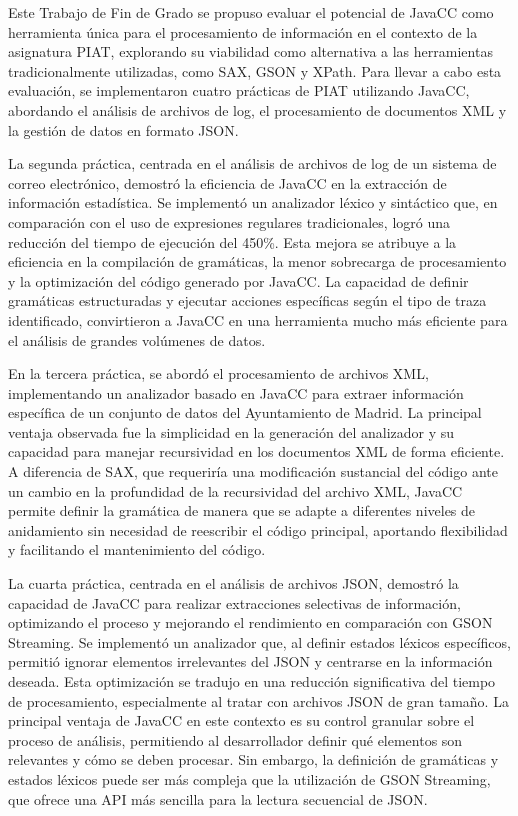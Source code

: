 \noindent Este Trabajo de Fin de Grado se propuso evaluar el potencial de JavaCC como herramienta única para el procesamiento de información en el contexto de la asignatura PIAT, explorando su viabilidad como alternativa a las herramientas tradicionalmente utilizadas, como SAX, GSON y XPath. Para llevar a cabo esta evaluación, se implementaron cuatro prácticas de PIAT utilizando JavaCC, abordando el análisis de archivos de log, el procesamiento de documentos XML y la gestión de datos en formato JSON.

La segunda práctica, centrada en el análisis de archivos de log de un sistema de correo electrónico, demostró la eficiencia de JavaCC en la extracción de información estadística. Se implementó un analizador léxico y sintáctico que, en comparación con el uso de expresiones regulares tradicionales, logró una reducción del tiempo de ejecución del 450\%. Esta mejora se atribuye a la eficiencia en la compilación de gramáticas, la menor sobrecarga de procesamiento y la optimización del código generado por JavaCC. La capacidad de definir gramáticas estructuradas y ejecutar acciones específicas según el tipo de traza identificado, convirtieron a JavaCC en una herramienta mucho más eficiente para el análisis de grandes volúmenes de datos.

En la tercera práctica, se abordó el procesamiento de archivos XML, implementando un analizador basado en JavaCC para extraer información específica de un conjunto de datos del Ayuntamiento de Madrid. La principal ventaja observada fue la simplicidad en la generación del analizador y su capacidad para manejar recursividad en los documentos XML de forma eficiente. A diferencia de SAX, que requeriría una modificación sustancial del código ante un cambio en la profundidad de la recursividad del archivo XML, JavaCC permite definir la gramática de manera que se adapte a diferentes niveles de anidamiento sin necesidad de reescribir el código principal, aportando flexibilidad y facilitando el mantenimiento del código.


La cuarta práctica, centrada en el análisis de archivos JSON, demostró la capacidad de JavaCC para realizar extracciones selectivas de información, optimizando el proceso y mejorando el rendimiento en comparación con GSON Streaming. Se implementó un analizador que, al definir estados léxicos específicos, permitió ignorar elementos irrelevantes del JSON y centrarse en la información deseada. Esta optimización se tradujo en una reducción significativa del tiempo de procesamiento, especialmente al tratar con archivos JSON de gran tamaño. La principal ventaja de JavaCC en este contexto es su control granular sobre el proceso de análisis, permitiendo al desarrollador definir qué elementos son relevantes y cómo se deben procesar. Sin embargo, la definición de gramáticas y estados léxicos puede ser más compleja que la utilización de GSON Streaming, que ofrece una API más sencilla para la lectura secuencial de JSON.


